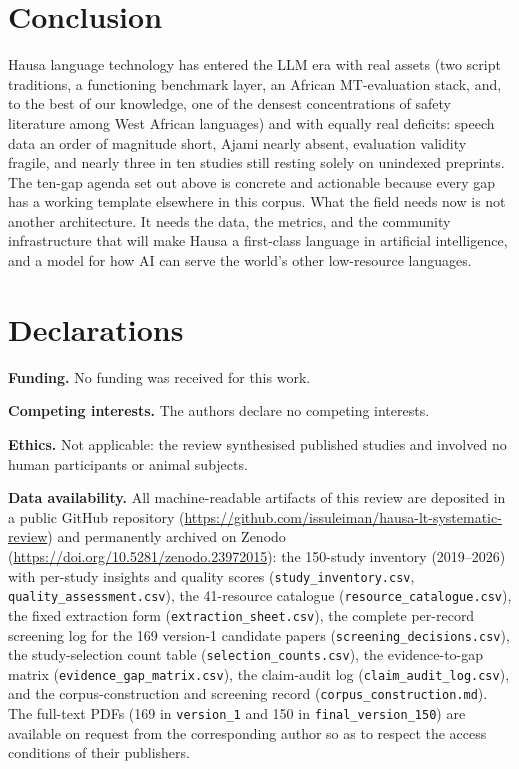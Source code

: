 \documentclass[sn-basic,pdflatex]{sn-jnl}
\begin{document}
\section{Conclusion}\label{sec:conclusion}
Hausa language technology has entered the LLM era with real assets (two script traditions, a functioning benchmark layer, an African MT-evaluation stack, and, to the best of our knowledge, one of the densest concentrations of safety literature among West African languages) and with equally real deficits: speech data an order of magnitude short, Ajami nearly absent, evaluation validity fragile, and nearly three in ten studies still resting solely on unindexed preprints. The ten-gap agenda set out above is concrete and actionable because every gap has a working template elsewhere in this corpus. What the field needs now is not another architecture. It needs the data, the metrics, and the community infrastructure that will make Hausa a first-class language in artificial intelligence, and a model for how AI can serve the world's other low-resource languages.

\section*{Declarations}\label{sec:data}

\noindent\textbf{Funding.} No funding was received for this work.

\medskip\noindent\textbf{Competing interests.} The authors declare no competing interests.

\medskip\noindent\textbf{Ethics.} Not applicable: the review synthesised published studies and involved no human participants or animal subjects.

\medskip\noindent\textbf{Data availability.} All machine-readable artifacts of this review are deposited in a public GitHub repository (\url{https://github.com/issuleiman/hausa-lt-systematic-review}) and permanently archived on Zenodo (\url{https://doi.org/10.5281/zenodo.23972015}): the 150-study inventory (2019--2026) with per-study insights and quality scores (\texttt{study\_inventory.csv}, \texttt{quality\_assessment.csv}), the 41-resource catalogue (\texttt{resource\_catalogue.csv}), the fixed extraction form (\texttt{extraction\_sheet.csv}), the complete per-record screening log for the 169 version-1 candidate papers (\texttt{screening\_decisions.csv}), the study-selection count table (\texttt{selection\_counts.csv}), the evidence-to-gap matrix (\texttt{evidence\_gap\_matrix.csv}), the claim-audit log (\texttt{claim\_audit\_log.csv}), and the corpus-construction and screening record (\texttt{corpus\_construction.md}). The full-text PDFs (169 in \texttt{version\_1} and 150 in \texttt{final\_version\_150}) are available on request from the corresponding author so as to respect the access conditions of their publishers.
\end{document}
